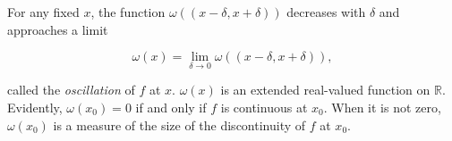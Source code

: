 For any fixed $x$, the function $\omega((x - \delta, x + \delta))$ decreases with $\delta$ and approaches a limit

$$\omega(x) = \lim_{\delta \to 0} \omega((x - \delta, x + \delta)),$$

called the \emph{oscillation} of $f$ at $x$. $\omega(x)$ is an extended real-valued function on $\mathbb{R}$. Evidently, $\omega(x_0) = 0$ if and only if $f$ is continuous at $x_0$. When it is not zero, $\omega(x_0)$ is a measure of the size of the discontinuity of $f$ at $x_0$.
